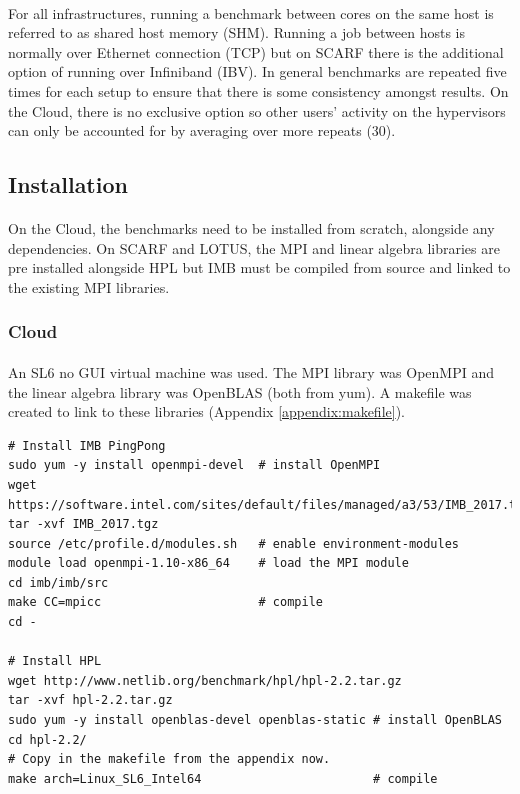 \documentclass{article}
\newenvironment{code}{\captionsetup{type=listing}}{}
\begin{document}
    \paragraph{}
    For all infrastructures, running a benchmark between cores on the same host is referred to as shared host memory (SHM). Running a job between hosts is normally over Ethernet connection (TCP) but on SCARF there is the additional option of running over Infiniband (IBV). In general benchmarks are repeated five times for each setup to ensure that there is some consistency amongst results. On the Cloud, there is no exclusive option so other users' activity on the hypervisors can only be accounted for by averaging over more repeats (30).

    \subsection{Installation} \label{installation}

        \paragraph{}
        On the Cloud, the benchmarks need to be installed from scratch, alongside any dependencies. On SCARF and LOTUS, the MPI and linear algebra libraries are pre installed alongside HPL but IMB must be compiled from source and linked to the existing MPI libraries.

        \subsubsection{Cloud} \label{cloud-installation}

        \paragraph{}
        An SL6 no GUI virtual machine was used. The MPI library was OpenMPI and the linear algebra library was OpenBLAS (both from yum). A makefile was created to link to these libraries (Appendix \ref{appendix:makefile}).

            \begin{code}
            \label{code:builds-cloud-build-sh}
            \begin{verbatim}
# Install IMB PingPong
sudo yum -y install openmpi-devel  # install OpenMPI
wget https://software.intel.com/sites/default/files/managed/a3/53/IMB_2017.tgz
tar -xvf IMB_2017.tgz
source /etc/profile.d/modules.sh   # enable environment-modules
module load openmpi-1.10-x86_64    # load the MPI module
cd imb/imb/src
make CC=mpicc                      # compile
cd -

# Install HPL
wget http://www.netlib.org/benchmark/hpl/hpl-2.2.tar.gz
tar -xvf hpl-2.2.tar.gz
sudo yum -y install openblas-devel openblas-static # install OpenBLAS
cd hpl-2.2/
# Copy in the makefile from the appendix now.
make arch=Linux_SL6_Intel64                        # compile
            \end{verbatim}
            \end{code}
\end{document}
